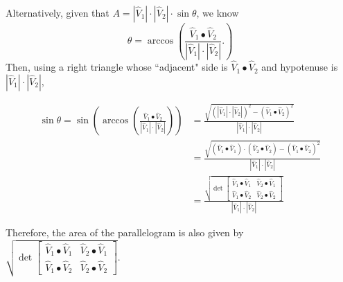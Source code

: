 \documentclass{ximera}
\begin{document}
\begin{problem}
\begin{freeResponse}
Alternatively, given that $A = |\hat{V}_{1}| \cdot |\hat{V}_{2}| \cdot\sin\theta$, we know
\[
\theta = \arccos \left( 
	\frac{\hat{V}_{1}\bullet\hat{V}_{2}}{\left\vert \hat{V}_{1}\right\vert \cdot\left\vert \hat{V}_{2}\right\vert}.
		 \right)
\]
Then, using a right triangle whose ``adjacent" side is $\hat{V}_{1}\bullet\hat{V}_{2}$ and hypotenuse is $\left\vert \hat{V}_{1}\right\vert \cdot\left\vert \hat{V}_{2}\right\vert$,

\begin{align*}
\sin \theta = \sin\left(  \arccos\left(  \frac{\hat{V}_{1}\bullet\hat{V}_{2}}{\left\vert \hat{V}_{1}\right\vert \cdot\left\vert 	\hat{V}_{2}\right\vert} \right)  \right) 
	&= \frac{\sqrt{
	 \left( \left\vert \hat{V}_{1}\right\vert \cdot\left\vert \hat{V}_{2}\right\vert \right)^2 
	- \left( \hat{V}_{1}\bullet\hat{V}_{2} \right)^2}}{\left\vert \hat{V}_{1}\right\vert \cdot\left\vert \hat{V}_{2}\right\vert}  \\
	&= \frac{\sqrt{ 
	\left( \hat{V}_{1}\bullet\hat{V}_{1} \right) \cdot \left(\hat{V}_{2}\bullet\hat{V}_{2} \right)
	- \left( \hat{V}_{1}\bullet\hat{V}_{2} \right)^2}}{\left\vert\hat{V}_{1}\right\vert \cdot\left\vert \hat{V}_{2}\right\vert}\\
	&=\frac{\sqrt{\det
    	\begin{bmatrix}
      		\hat{V}_{1}\bullet\hat{V}_{1} & \hat{V}_{2}\bullet\hat{V}_{1}\\
      		\hat{V}_{1}\bullet\hat{V}_{2} & \hat{V}_{2}\bullet\hat{V}_{2}
    	\end{bmatrix}}}{\left\vert\hat{V}_{1}\right\vert \cdot\left\vert \hat{V}_{2}\right\vert}
\end{align*}

Therefore, the area of the parallelogram is also given by
$\sqrt{\det
    \begin{bmatrix}
      \hat{V}_{1}\bullet\hat{V}_{1} & \hat{V}_{2}\bullet\hat{V}_{1}\\
      \hat{V}_{1}\bullet\hat{V}_{2} & \hat{V}_{2}\bullet\hat{V}_{2}
    \end{bmatrix}}$.

\end{freeResponse}

\end{problem}
\end{document}

